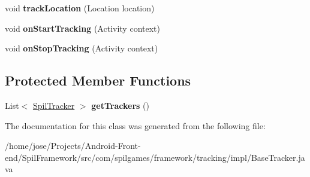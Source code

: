 \begin{DoxyCompactItemize}
\item 
\hypertarget{classcom_1_1spilgames_1_1framework_1_1tracking_1_1impl_1_1_base_tracker_a83193acc443d222bafd4653c7e762f7c}{void {\bfseries track\-Location} (Location location)}\label{classcom_1_1spilgames_1_1framework_1_1tracking_1_1impl_1_1_base_tracker_a83193acc443d222bafd4653c7e762f7c}

\item 
\hypertarget{classcom_1_1spilgames_1_1framework_1_1tracking_1_1impl_1_1_base_tracker_af52c9170b32c2780584f5c2bd8f08d56}{void {\bfseries on\-Start\-Tracking} (Activity context)}\label{classcom_1_1spilgames_1_1framework_1_1tracking_1_1impl_1_1_base_tracker_af52c9170b32c2780584f5c2bd8f08d56}

\item 
\hypertarget{classcom_1_1spilgames_1_1framework_1_1tracking_1_1impl_1_1_base_tracker_a17f4ffb08dd6a60893f7dd227422e016}{void {\bfseries on\-Stop\-Tracking} (Activity context)}\label{classcom_1_1spilgames_1_1framework_1_1tracking_1_1impl_1_1_base_tracker_a17f4ffb08dd6a60893f7dd227422e016}

\end{DoxyCompactItemize}
\subsection*{Protected Member Functions}
\begin{DoxyCompactItemize}
\item 
\hypertarget{classcom_1_1spilgames_1_1framework_1_1tracking_1_1impl_1_1_base_tracker_a463efab11e4cc83218ecbbb65ff81d4a}{List$<$ \hyperlink{interfacecom_1_1spilgames_1_1framework_1_1tracking_1_1_spil_tracker}{Spil\-Tracker} $>$ {\bfseries get\-Trackers} ()}\label{classcom_1_1spilgames_1_1framework_1_1tracking_1_1impl_1_1_base_tracker_a463efab11e4cc83218ecbbb65ff81d4a}

\end{DoxyCompactItemize}


The documentation for this class was generated from the following file\-:\begin{DoxyCompactItemize}
\item 
/home/jose/\-Projects/\-Android-\/\-Front-\/end/\-Spil\-Framework/src/com/spilgames/framework/tracking/impl/Base\-Tracker.\-java\end{DoxyCompactItemize}
